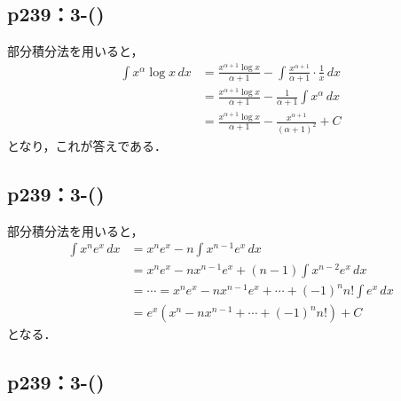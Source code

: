 \documentclass[a4paper,10pt,fleqn]{ltjsarticle}
\begin{document}
\subsection*{p239：3-()}

\begin{tleftbar}
    部分積分法を用いると，
    \begin{align*}
        \int x^\alpha \log x \, dx & = \frac{x^{\alpha +1} \log x}{\alpha +1}　- \int \frac{x^{\alpha +1}}{\alpha+1} \cdot \frac{1}{x} \, dx \\
                                   & = \frac{x^{\alpha +1} \log x}{\alpha +1}- \frac{1}{\alpha +1} \int x^{\alpha} \, dx                    \\
                                   & = \frac{x^{\alpha+1} \log x}{\alpha +1} - \frac{x^{\alpha +1}}{(\alpha +1)^2}+ C
    \end{align*}
    となり，これが答えである．
\end{tleftbar}

\subsection*{p239：3-()}

\begin{tleftbar}
    部分積分法を用いると，
    \begin{align*}
        \int x^n e^x \, dx & = x^n e^x - n \int x^{n-1} e^x \, dx                                   \\
                           & = x^n e^x - n x^{n-1} e^x + (n-1)\int x^{n-2} e^x \, dx                \\
                           & = \cdots = x^n e^x - n x^{n-1} e^x + \cdots + (-1)^n n! \int e^x \, dx \\
                           & = e^x (x^n -n x^{n-1}+ \cdots +(-1)^n n!) + C
    \end{align*}
    となる．
\end{tleftbar}

\subsection*{p239：3-()}
\end{document}
